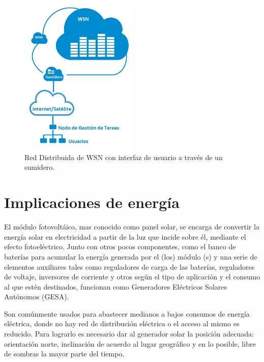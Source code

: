 \begin{figure}[h!]
	\centering
    \includegraphics[width=0.5\textwidth]{./Figures/RedDistribuida.png}
    	\caption{Red Distribuida de WSN con interfaz de usuario a través de un sumidero.}
	\label{fig:distrib}
\end{figure} 

\section{Implicaciones de energía}
\label{sec:energía}

El módulo fotovoltáico, mas conocido como panel solar, se encarga de convertir la energía solar en electricidad a partir de la luz que incide sobre él, mediante el efecto fotoeléctrico. Junto con otros pocos componentes, como el banco de baterías para acumular la energía generada por el (los) módulo (s) y una serie de elementos auxiliares tales como reguladores de carga de las baterías, reguladores de voltaje, inversores de corriente y otros según el tipo de aplicación y el consumo al que estén destinados, funcionan como Generadores Eléctricos Solares Autónomos (GESA).

Son comúnmente usados para abastecer medianos a bajos consumos de energía eléctrica, donde no hay red de distribución eléctrica o el acceso al mismo es reducido. Para lograrlo es necesario dar al generador solar la posición adecuada: orientación norte, inclinación de acuerdo al lugar geográfico y en lo posible, libre de sombras la mayor parte del tiempo.

